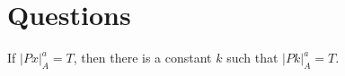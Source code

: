 \documentclass[a4paper, 11pt]{article} %
\newenvironment{Answer}[1][Answer]
  {\proof[#1]\leftskip=1cm\rightskip=1cm}
  {\endproof}
\newcommand{\set}[1]{\lbrace#1\rbrace} %
\newenvironment{customthm}[1]
  {\renewcommand\theinnercustomthm{#1}\innercustomthm}
  {\endinnercustomthm}
\theoremstyle{theorem}
\theoremstyle{Pthm}
\begin{document}

  





  






  



\section*{Questions}

\vspace{.1in}
\begin{customthm}{(1)}
If $|Px|_A^a = T$, then there is a constant $k$ such that $|Pk|_A^a = T$.
\end{customthm}

\begin{Answer}
\end{Answer}








\end{document}
